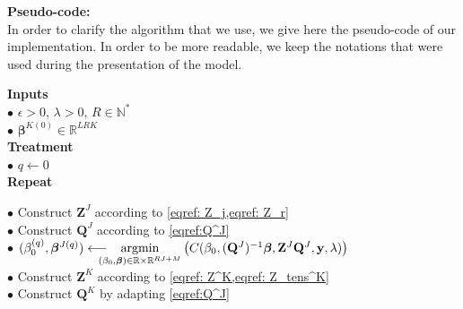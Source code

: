 \documentclass[10pt]{article}
\begin{document}
\vspace{7 pt}

{\fontsize{12}{8}\selectfont \noindent \textbf{Pseudo-code:}}\\[1 pt] 
In order to clarify the algorithm that we use, we give here the pseudo-code of our implementation. In order to be more readable, we keep the notations that were used during the presentation of the model.\\[5 pt]
\newpage
\begin{mdframed}[leftmargin=0cm, rightmargin=4cm]
\noindent \textbf{Inputs}\\
\phantom{a}\hspace{5 pt} $\bullet$ $\epsilon >0$, $\lambda >0$, $R \in \mathbb{N}^{*}$\\[2 pt]
\phantom{a}\hspace{5 pt} $\bullet$ $\bm{\beta}^{K(0)} \in \mathbb{R}^{LRK}$\\[4 pt]
\textbf{Treatment}\\
\phantom{a}\hspace{5 pt} $\bullet$ $q \leftarrow 0$\\[2 pt]
\phantom{a}\hspace{5 pt}  \textbf{Repeat}\\[2 pt]
\phantom{a}\hspace{22 pt} $\bullet$ Construct $\mathbf{Z}^J$ according to \cref{eqref: Z_j,eqref: Z_r}\\[2 pt]
\phantom{a}\hspace{25 pt} $\bullet$ Construct $\mathbf{Q}^J$ according to \cref{eqref:Q^J}\\[2 pt]
\phantom{a}\hspace{25 pt}  $\bullet$ $(\beta_0^{(q)}, \bm{\beta}^{J {(q)}}) \longleftarrow \hspace{-10 pt} \underset{(\beta_0, \bm{\beta}) \in \mathbb{R} \times \mathbb{R}^{RJ + M}}{\text{argmin}} \left( C(\beta_0, (\mathbf{Q}^J)^{-1}\bm{\beta},\mathbf{Z}^J \mathbf{Q}^J, \mathbf{y}, \lambda) \right)$\\[2 pt]
\phantom{a}\hspace{25 pt} $\bullet$ Construct $\mathbf{Z}^K$ according to \cref{eqref: Z^K,eqref: Z_tens^K}\\[3 pt]
\phantom{a}\hspace{25 pt} $\bullet$ Construct $\mathbf{Q}^K$ by adapting \cref{eqref:Q^J}\\[2 pt]

\end{mdframed}
\end{document}
